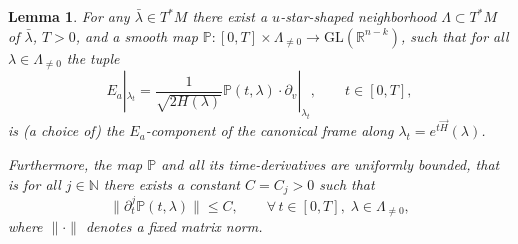 \documentclass[11pt,a4paper]{article}
\theoremstyle{plain}
\newtheorem{lemma}[theorem]{Lemma}
\theoremstyle{definition}
\theoremstyle{remark}
\numberwithin{equation}{section}
\newcommand{\R}{\mathbb{R}} %
\newcommand{\N}{\mathbb{N}} %
\renewcommand{\P}{\mathbb{P}}
\begin{document}
\begin{lemma}\label{l:lemmaEa}
For any $\bar{\lambda}\in T^*M$ there exist a $u$-star-shaped neighborhood $\Lambda \subset T^*M$ of $\bar{\lambda}$, $T>0$, and a smooth map $\P: [0,T]\times \Lambda_{\neq 0} \to \mathrm{GL}(\R^{n-k})$, such that for all $\lambda \in \Lambda_{\neq 0}$ the tuple
\begin{equation}
E_a|_{\lambda_t} = \frac{1}{\sqrt{2H(\lambda)}}\P(t,\lambda) \cdot\partial_v|_{\lambda_t}, \qquad t\in[0,T],
\end{equation}
is (a choice of) the $E_a$-component of the canonical frame along $\lambda_t = e^{t\vec{H}}(\lambda)$.

Furthermore, the map $\P$ and all its time-derivatives are uniformly bounded, that is for all $j\in \N$ there exists a constant $C=C_j>0$ such that
\begin{equation}
\|\partial_t^{j}\P(t,\lambda)\| \leq C ,\qquad \forall\, t \in [0,T],\; \lambda \in \Lambda_{\neq 0},
\end{equation}
where $\|\cdot\|$ denotes a fixed matrix norm.
\end{lemma}
\end{document}
